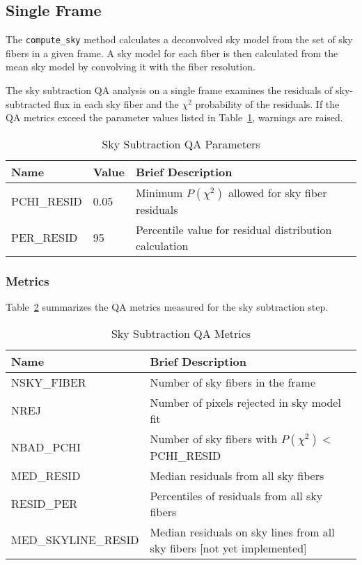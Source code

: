 \documentclass[12pt]{article}
\begin{document}
\subsection{Single Frame}

The {\tt compute\_sky} method calculates a deconvolved sky model
from the set of sky fibers in a given frame.
A sky model for each fiber is then calculated from the 
mean sky model by convolving it with the fiber resolution.

The sky subtraction QA analysis on a single 
frame examines the residuals of sky-subtracted flux in each sky fiber
and the $\chi^2$ probability of the residuals.
If the QA metrics exceed the 
parameter values listed in Table~\ref{tab:sky_param},
warnings are raised.

\begin{table}[h]
\begin{center}
\caption{Sky Subtraction QA Parameters}
\label{tab:sky_param}
\begin{tabular}{p{3.5cm}p{1.2cm}p{8.3cm}}
\hline
{\bf Name} & {\bf Value} & {\bf Brief Description}\\
\hline
PCHI\_RESID    & 0.05 & Minimum $P(\chi^2)$ allowed for sky fiber residuals \\ 
PER\_RESID     & 95   & Percentile value for residual distribution calculation\\
\hline
\end{tabular}
\end{center}
\end{table}

\subsubsection{Metrics}

Table~\ref{tab:sky_metrics} summarizes the QA metrics measured
for the sky subtraction step.  

\begin{table}[h]
\begin{center}
\caption{Sky Subtraction QA Metrics}
\label{tab:sky_metrics}
\begin{tabular}{p{4.3cm}p{9.0cm}}
\hline
{\bf Name} & {\bf Brief Description}\\
\hline
NSKY\_FIBER           & Number of sky fibers in the frame \\
NREJ                  & Number of pixels rejected in sky model fit \\
NBAD\_PCHI            & Number of sky fibers with $P(\chi^2) < $PCHI\_RESID \\
MED\_RESID            & Median residuals from all sky fibers \\
RESID\_PER            & Percentiles of residuals from all sky fibers \\
MED\_SKYLINE\_RESID   & Median residuals on sky lines from all sky fibers [not yet implemented]\\
\hline
\end{tabular}
\end{center}
\end{table}
\end{document}

